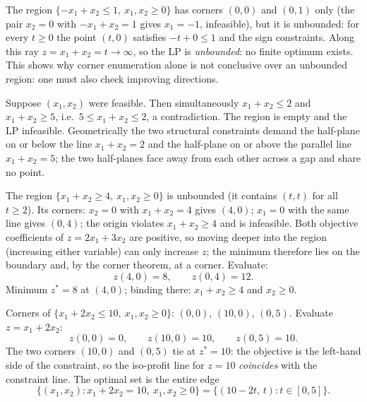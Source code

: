 \begin{solutions}
  \item The region $\{-x_{1}+x_{2}\le 1,\ x_{1},x_{2}\ge 0\}$ has
        corners $(0,0)$ and $(0,1)$ only (the pair $x_{2}=0$ with
        $-x_{1}+x_{2}=1$ gives $x_{1}=-1$, infeasible), but it is
        unbounded: for every $t\ge 0$ the point $(t,0)$ satisfies
        $-t+0\le 1$ and the sign constraints. Along this ray
        $z=x_{1}+x_{2}=t\to\infty$, so the LP is \emph{unbounded}: no
        finite optimum exists. This shows why corner enumeration alone
        is not conclusive over an unbounded region: one must also
        check improving directions.

  \item Suppose $(x_{1},x_{2})$ were feasible. Then simultaneously
        $x_{1}+x_{2}\le 2$ and $x_{1}+x_{2}\ge 5$, i.e.\
        $5\le x_{1}+x_{2}\le 2$, a contradiction. The region is
        empty and the LP infeasible. Geometrically the two structural
        constraints demand the half-plane on or below the line
        $x_{1}+x_{2}=2$ and the half-plane on or above the parallel
        line $x_{1}+x_{2}=5$; the two half-planes face away from each
        other across a gap and share no point.

  \item The region $\{x_{1}+x_{2}\ge 4,\ x_{1},x_{2}\ge 0\}$ is
        unbounded (it contains $(t,t)$ for all $t\ge 2$). Its corners:
        $x_{2}=0$ with $x_{1}+x_{2}=4$ gives $(4,0)$; $x_{1}=0$ with
        the same line gives $(0,4)$; the origin violates
        $x_{1}+x_{2}\ge 4$ and is infeasible. Both objective
        coefficients of $z=2x_{1}+3x_{2}$ are positive, so moving
        deeper into the region (increasing either variable) can only
        increase $z$; the minimum therefore lies on the boundary and,
        by the corner theorem, at a corner. Evaluate:
        \[
          z(4,0)=8,\qquad z(0,4)=12 .
        \]
        Minimum $z^{*}=8$ at $(4,0)$; binding there:
        $x_{1}+x_{2}\ge 4$ and $x_{2}\ge 0$.

  \item Corners of $\{x_{1}+2x_{2}\le 10,\ x_{1},x_{2}\ge 0\}$:
        $(0,0)$, $(10,0)$, $(0,5)$. Evaluate $z=x_{1}+2x_{2}$:
        \[
          z(0,0)=0,\qquad z(10,0)=10,\qquad z(0,5)=10 .
        \]
        The two corners $(10,0)$ and $(0,5)$ tie at $z^{*}=10$: the
        objective is the left-hand side of the constraint, so the
        iso-profit line for $z=10$ \emph{coincides} with the constraint
        line. The optimal set is the entire edge
        \[
          \{(x_{1},x_{2}):x_{1}+2x_{2}=10,\ x_{1},x_{2}\ge 0\}
          =\{(10-2t,\,t):t\in[0,5]\} .
        \]


\end{solutions}
